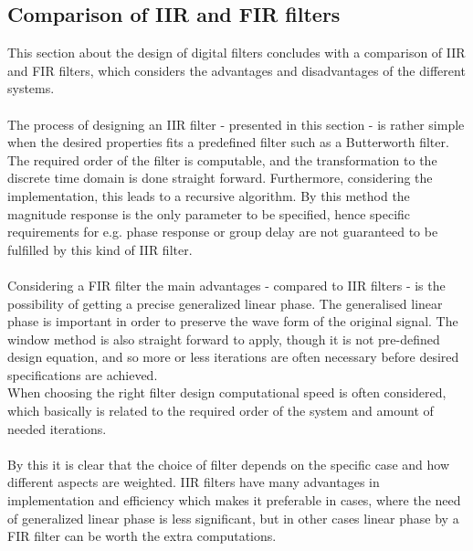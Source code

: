 \subsection{Comparison of IIR and FIR filters}
This section about the design of digital filters concludes with a comparison of IIR and FIR filters, which considers the advantages and disadvantages of the different systems. \\ 
\\
The process of designing an IIR filter - presented in this section - is rather simple when the desired properties fits a predefined filter such as a Butterworth filter. The required order of the filter is computable, and the transformation to the discrete time domain is done straight forward. Furthermore, considering the implementation, this leads to a recursive algorithm. By this method the magnitude response is the only parameter to be specified, hence specific requirements for e.g. phase response or group delay are not guaranteed to be fulfilled by this kind of IIR filter. \\ \\
Considering a FIR filter the main advantages - compared to IIR filters - is the possibility of getting a precise generalized linear phase. The generalised linear phase is important in order to preserve the wave form of the original signal.  
The window method is also straight forward to apply, though it is not pre-defined design equation, and so more or less iterations are often necessary before desired specifications are achieved. \\
When choosing the right filter design computational speed is often considered, which basically is related to the required order of the system and amount of needed iterations. \\
\\
By this it is clear that the choice of filter depends on the specific case and how different aspects are weighted. IIR filters have many advantages in implementation and efficiency which makes it preferable in cases, where the need of generalized linear phase is less significant, but in other cases linear phase by a FIR filter can be worth the extra computations.